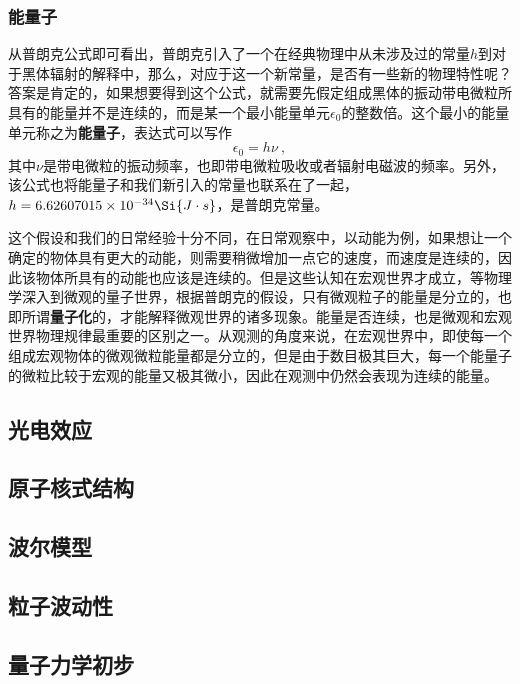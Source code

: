 \subsubsection{能量子}
从普朗克公式即可看出，普朗克引入了一个在经典物理中从未涉及过的常量$h$到对于黑体辐射的解释中，那么，对应于这一个新常量，是否有一些新的物理特性呢？答案是肯定的，如果想要得到这个公式，就需要先假定组成黑体的振动带电微粒所具有的能量并不是连续的，而是某一个最小能量单元$\epsilon_0$的整数倍。这个最小的能量单元称之为\textbf{能量子}，表达式可以写作$$\epsilon_0=h\nu ~,$$其中$\nu$是带电微粒的振动频率，也即带电微粒吸收或者辐射电磁波的频率。另外，该公式也将能量子和我们新引入的常量也联系在了一起，$h=6.62607015\times 10^{-34}\Si{J\cdot s}$，是普朗克常量。

这个假设和我们的日常经验十分不同，在日常观察中，以动能为例，如果想让一个确定的物体具有更大的动能，则需要稍微增加一点它的速度，而速度是连续的，因此该物体所具有的动能也应该是连续的。但是这些认知在宏观世界才成立，等物理学深入到微观的量子世界，根据普朗克的假设，只有微观粒子的能量是分立的，也即所谓\textbf{量子化}的，才能解释微观世界的诸多现象。能量是否连续，也是微观和宏观世界物理规律最重要的区别之一。从观测的角度来说，在宏观世界中，即使每一个组成宏观物体的微观微粒能量都是分立的，但是由于数目极其巨大，每一个能量子的微粒比较于宏观的能量又极其微小，因此在观测中仍然会表现为连续的能量。

\subsection{光电效应}
\subsection{原子核式结构}
\subsection{波尔模型}
\subsection{粒子波动性}
\subsection{量子力学初步}

% 
% 
